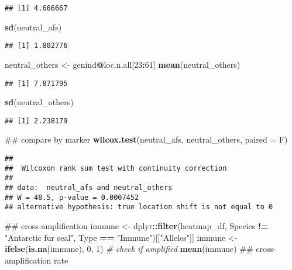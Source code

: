 \documentclass[]{article}
\newenvironment{Shaded}{\begin{snugshade}}{\end{snugshade}}
\newcommand{\KeywordTok}[1]{\textcolor[rgb]{0.13,0.29,0.53}{\textbf{#1}}}
\newcommand{\DataTypeTok}[1]{\textcolor[rgb]{0.13,0.29,0.53}{#1}}
\newcommand{\DecValTok}[1]{\textcolor[rgb]{0.00,0.00,0.81}{#1}}
\newcommand{\StringTok}[1]{\textcolor[rgb]{0.31,0.60,0.02}{#1}}
\newcommand{\CommentTok}[1]{\textcolor[rgb]{0.56,0.35,0.01}{\textit{#1}}}
\newcommand{\OperatorTok}[1]{\textcolor[rgb]{0.81,0.36,0.00}{\textbf{#1}}}
\newcommand{\NormalTok}[1]{#1}
\begin{document}
\begin{verbatim}
## [1] 4.666667
\end{verbatim}

\begin{Shaded}
\begin{Highlighting}[]
\KeywordTok{sd}\NormalTok{(neutral_afs)}
\end{Highlighting}
\end{Shaded}

\begin{verbatim}
## [1] 1.802776
\end{verbatim}

\begin{Shaded}
\begin{Highlighting}[]
\NormalTok{neutral_others <-}\StringTok{ }\NormalTok{genind}\OperatorTok{@}\NormalTok{loc.n.all[}\DecValTok{23}\OperatorTok{:}\DecValTok{61}\NormalTok{]}
\KeywordTok{mean}\NormalTok{(neutral_others)}
\end{Highlighting}
\end{Shaded}

\begin{verbatim}
## [1] 7.871795
\end{verbatim}

\begin{Shaded}
\begin{Highlighting}[]
\KeywordTok{sd}\NormalTok{(neutral_others)}
\end{Highlighting}
\end{Shaded}

\begin{verbatim}
## [1] 2.238179
\end{verbatim}

\begin{Shaded}
\begin{Highlighting}[]
\NormalTok{## compare by marker}
\KeywordTok{wilcox.test}\NormalTok{(neutral_afs, neutral_others, }\DataTypeTok{paired =}\NormalTok{ F)}
\end{Highlighting}
\end{Shaded}

\begin{verbatim}
## 
##  Wilcoxon rank sum test with continuity correction
## 
## data:  neutral_afs and neutral_others
## W = 48.5, p-value = 0.0007452
## alternative hypothesis: true location shift is not equal to 0
\end{verbatim}

\begin{Shaded}
\begin{Highlighting}[]
\NormalTok{## cross-amplification}
\NormalTok{immune <-}\StringTok{ }\NormalTok{dplyr}\OperatorTok{::}\KeywordTok{filter}\NormalTok{(heatmap_df, Species }\OperatorTok{!=}\StringTok{ "Antarctic fur seal"}\NormalTok{, Type }\OperatorTok{==}\StringTok{ "Immune"}\NormalTok{)[[}\StringTok{"Alleles"}\NormalTok{]]}
\NormalTok{immune <-}\StringTok{ }\KeywordTok{ifelse}\NormalTok{(}\KeywordTok{is.na}\NormalTok{(immune), }\DecValTok{0}\NormalTok{, }\DecValTok{1}\NormalTok{) }\CommentTok{# check if amplified}
\KeywordTok{mean}\NormalTok{(immune) ## cross-amplification rate}
\end{Highlighting}
\end{Shaded}
\end{document}
